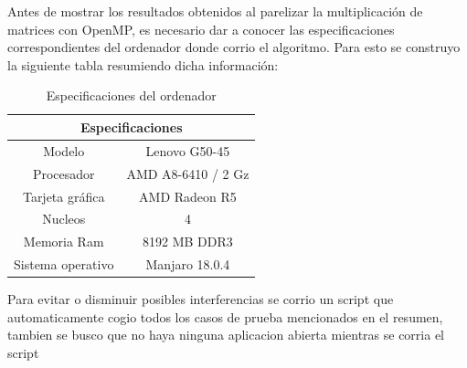 \documentclass{IEEEtran}
\begin{document}
Antes de mostrar los resultados obtenidos al parelizar la multiplicación  de matrices   con OpenMP, es necesario dar a conocer las especificaciones correspondientes del ordenador donde corrio el algoritmo. Para esto se construyo la siguiente tabla resumiendo dicha información:

\begin{table}[H]
\centering
    \begin{tabular}{ |c|c| } 
\hline
\multicolumn{2}{|c|}{Especificaciones} \\
\hline
Modelo & Lenovo G50-45\\
 \hline
 Procesador & AMD A8-6410 / 2 Gz \\ 
 \hline
 Tarjeta gráfica & AMD Radeon R5 \\ 
 \hline
 Nucleos & 4\\ 
 \hline
 Memoria Ram & 8192 MB DDR3
 \\ 
 \hline
 Sistema operativo & Manjaro 18.0.4 \\ 
 \hline
\end{tabular}
\caption{Especificaciones del ordenador}
\end{table}

Para evitar o disminuir posibles interferencias se corrio un script que automaticamente cogio todos los casos de prueba mencionados en el resumen, tambien se busco que no haya ninguna aplicacion abierta mientras se corria el script
\end{document}
